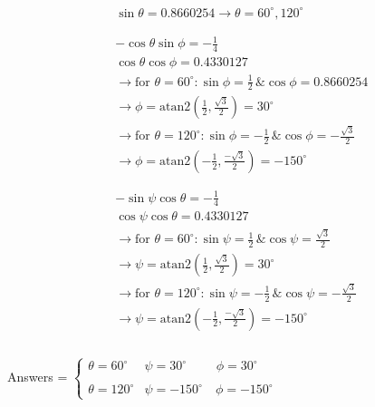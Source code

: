 \documentclass[conference]{IEEEtran}
\begin{document}
\begin{align}
    &\sin \theta = 0.8660254 \rightarrow \theta = 60^\circ , 120^\circ \\
    \, \nonumber \\
    \hline
    \, \nonumber \\
    &-\cos \theta \sin \phi = -\frac{1}{4} \\
    &\cos \theta \cos \phi = 0.4330127 \\
    &\rightarrow \text{for } \theta = 60^\circ : \sin \phi = \frac{1}{2} \, \& \cos \phi = 0.8660254 \nonumber \\
    &\rightarrow \phi = \text{atan2}(\frac{1}{2}, \frac{\sqrt{3}}{2}) = 30^\circ \\
    &\rightarrow \text{for } \theta = 120^\circ : \sin \phi = -\frac{1}{2} \, \& \cos \phi = -\frac{\sqrt{3}}{2} \nonumber \\
    &\rightarrow \phi = \text{atan2}(-\frac{1}{2}, \frac{-\sqrt{3}}{2}) = -150^\circ \\
    \, \nonumber \\
    \hline
    \, \nonumber \\
    &-\sin \psi \cos \theta = -\frac{1}{4} \\
    &\cos \psi \cos \theta = 0.4330127 \\
    &\rightarrow \text{for } \theta = 60^\circ : \sin \psi = \frac{1}{2} \, \& \cos \psi = \frac{\sqrt{3}}{2} \nonumber \\
    &\rightarrow \psi = \text{atan2}(\frac{1}{2}, \frac{\sqrt{3}}{2}) = 30^\circ \\
    &\rightarrow \text{for } \theta = 120^\circ : \sin \psi = -\frac{1}{2} \, \& \cos \psi = -\frac{\sqrt{3}}{2} \nonumber \\
    &\rightarrow \psi = \text{atan2}(-\frac{1}{2}, \frac{-\sqrt{3}}{2}) = -150^\circ \\
    \, \nonumber \\
    \hline
    \, \nonumber
\end{align}

Answers = 
$
\begin{cases}
    \theta = 60^\circ & \psi = 30^\circ \quad \quad \,\, \phi = 30^\circ \\
    \\
    \theta = 120^\circ & \psi = -150^\circ \quad \phi = -150^\circ 
\end{cases}
$

\vspace{1cm}
\end{document}
